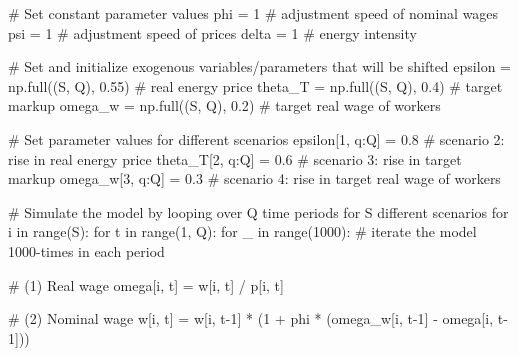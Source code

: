 \documentclass[
  letterpaper,
  DIV=11,
  numbers=noendperiod]{scrreprt}
\newenvironment{Shaded}{\begin{snugshade}}{\end{snugshade}}
\newcommand{\BuiltInTok}[1]{\textcolor[rgb]{0.00,0.23,0.31}{#1}}
\newcommand{\CommentTok}[1]{\textcolor[rgb]{0.37,0.37,0.37}{#1}}
\newcommand{\ControlFlowTok}[1]{\textcolor[rgb]{0.00,0.23,0.31}{#1}}
\newcommand{\DecValTok}[1]{\textcolor[rgb]{0.68,0.00,0.00}{#1}}
\newcommand{\FloatTok}[1]{\textcolor[rgb]{0.68,0.00,0.00}{#1}}
\newcommand{\KeywordTok}[1]{\textcolor[rgb]{0.00,0.23,0.31}{#1}}
\newcommand{\NormalTok}[1]{\textcolor[rgb]{0.00,0.23,0.31}{#1}}
\newcommand{\OperatorTok}[1]{\textcolor[rgb]{0.37,0.37,0.37}{#1}}
\begin{document}
\begin{tcolorbox}
\begin{Shaded}
\begin{Highlighting}[]
\CommentTok{\# Set constant parameter values}
\NormalTok{phi }\OperatorTok{=} \DecValTok{1}     \CommentTok{\# adjustment speed of nominal wages}
\NormalTok{psi }\OperatorTok{=} \DecValTok{1}   \CommentTok{\# adjustment speed of prices}
\NormalTok{delta }\OperatorTok{=} \DecValTok{1}   \CommentTok{\# energy intensity}

\CommentTok{\# Set and initialize exogenous variables/parameters that will be shifted}
\NormalTok{epsilon }\OperatorTok{=}\NormalTok{ np.full((S, Q), }\FloatTok{0.55}\NormalTok{)  }\CommentTok{\# real energy price}
\NormalTok{theta\_T }\OperatorTok{=}\NormalTok{ np.full((S, Q), }\FloatTok{0.4}\NormalTok{)       }\CommentTok{\# target markup}
\NormalTok{omega\_w }\OperatorTok{=}\NormalTok{ np.full((S, Q), }\FloatTok{0.2}\NormalTok{)   }\CommentTok{\# target real wage of workers}

\CommentTok{\# Set parameter values for different scenarios}
\NormalTok{epsilon[}\DecValTok{1}\NormalTok{, q:Q] }\OperatorTok{=} \FloatTok{0.8}  \CommentTok{\# scenario 2: rise in real energy price}
\NormalTok{theta\_T[}\DecValTok{2}\NormalTok{, q:Q] }\OperatorTok{=} \FloatTok{0.6}      \CommentTok{\# scenario 3: rise in target markup}
\NormalTok{omega\_w[}\DecValTok{3}\NormalTok{, q:Q] }\OperatorTok{=} \FloatTok{0.3}  \CommentTok{\# scenario 4: rise in target real wage of workers}

\CommentTok{\# Simulate the model by looping over Q time periods for S different scenarios}
\ControlFlowTok{for}\NormalTok{ i }\KeywordTok{in} \BuiltInTok{range}\NormalTok{(S):}
    \ControlFlowTok{for}\NormalTok{ t }\KeywordTok{in} \BuiltInTok{range}\NormalTok{(}\DecValTok{1}\NormalTok{, Q):}
        \ControlFlowTok{for}\NormalTok{ \_ }\KeywordTok{in} \BuiltInTok{range}\NormalTok{(}\DecValTok{1000}\NormalTok{):  }\CommentTok{\# iterate the model 1000{-}times in each period}
            
            \CommentTok{\# (1) Real wage}
\NormalTok{            omega[i, t] }\OperatorTok{=}\NormalTok{ w[i, t] }\OperatorTok{/}\NormalTok{ p[i, t]}
              
            \CommentTok{\# (2) Nominal wage}
\NormalTok{            w[i, t] }\OperatorTok{=}\NormalTok{ w[i, t}\OperatorTok{{-}}\DecValTok{1}\NormalTok{] }\OperatorTok{*}\NormalTok{ (}\DecValTok{1} \OperatorTok{+}\NormalTok{ phi }\OperatorTok{*}\NormalTok{ (omega\_w[i, t}\OperatorTok{{-}}\DecValTok{1}\NormalTok{] }\OperatorTok{{-}}\NormalTok{ omega[i, t}\OperatorTok{{-}}\DecValTok{1}\NormalTok{]))}
            

\end{Highlighting}
\end{Shaded}
\end{tcolorbox}
\end{document}

